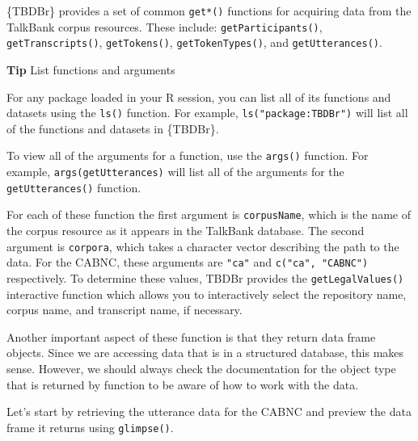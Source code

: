 \documentclass[
  letterpaper,
  krantz1]{latex/krantz-mod}
\theoremstyle{definition}
\theoremstyle{definition}
\theoremstyle{remark}
\begin{document}
\{TBDBr\} provides a set of common \texttt{get*()} functions for
acquiring data from the TalkBank corpus resources. These include:
\texttt{getParticipants()}, \texttt{getTranscripts()},
\texttt{getTokens()}, \texttt{getTokenTypes()}, and
\texttt{getUtterances()}.

\begin{tcolorbox}[enhanced jigsaw, leftrule=.75mm, colframe=quarto-callout-color-frame, left=2mm, colback=white, toprule=.15mm, breakable, arc=.35mm, opacityback=0, bottomrule=.15mm, rightrule=.15mm]

\textbf{ Tip} List functions and arguments

For any package loaded in your R session, you can list all of its
functions and datasets using the \texttt{ls()} function. For example,
\texttt{ls("package:TBDBr")} will list all of the functions and datasets
in \{TBDBr\}.

To view all of the arguments for a function, use the \texttt{args()}
function. For example, \texttt{args(getUtterances)} will list all of the
arguments for the \texttt{getUtterances()} function.

\end{tcolorbox}

For each of these function the first argument is \texttt{corpusName},
which is the name of the corpus resource as it appears in the TalkBank
database. The second argument is \texttt{corpora}, which takes a
character vector describing the path to the data. For the CABNC, these
arguments are \texttt{"ca"} and \texttt{c("ca",\ "CABNC")} respectively.
To determine these values, TBDBr provides the \texttt{getLegalValues()}
interactive function which allows you to interactively select the
repository name, corpus name, and transcript name, if necessary.

Another important aspect of these function is that they return data
frame objects. Since we are accessing data that is in a structured
database, this makes sense. However, we should always check the
documentation for the object type that is returned by function to be
aware of how to work with the data.

Let's start by retrieving the utterance data for the CABNC and preview
the data frame it returns using \texttt{glimpse()}.
\end{document}

